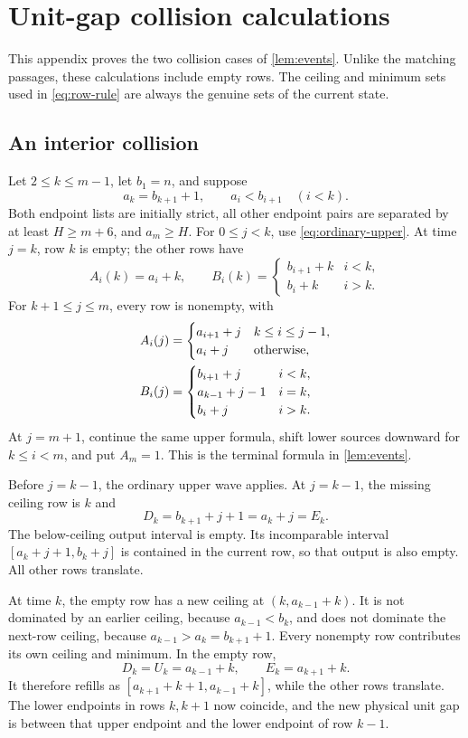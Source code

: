 \section{Unit-gap collision calculations}\label{app:unit}
This appendix proves the two collision cases of \cref{lem:events}. Unlike the matching passages, these calculations include empty rows. The ceiling and minimum sets used in \eqref{eq:row-rule} are always the genuine sets of the current state.

\subsection{An interior collision}
Let $2\le k\le m-1$, let $b_1=n$, and suppose
\[
 a_k=b_{k+1}+1,\qquad a_i<b_{i+1}\quad(i<k).
\]
Both endpoint lists are initially strict, all other endpoint pairs are separated by at least $H\ge m+6$, and $a_m\ge H$. For $0\le j<k$, use \eqref{eq:ordinary-upper}. At time $j=k$, row $k$ is empty; the other rows have
\[
 A_i(k)=a_i+k,\qquad
 B_i(k)=\begin{cases}b_{i+1}+k&i<k,\\b_i+k&i>k.\end{cases}
\]
For $k+1\le j\le m$, every row is nonempty, with
\begin{align}
 A_i(j)&=\begin{cases}a_{i+1}+j&k\le i\le j-1,\\a_i+j&\text{otherwise},\end{cases}\label{eq:interior-phases}\\
 B_i(j)&=\begin{cases}b_{i+1}+j&i<k,\\a_{k-1}+j-1&i=k,\\b_i+j&i>k.\end{cases}\notag
\end{align}
At $j=m+1$, continue the same upper formula, shift lower sources downward for $k\le i<m$, and put $A_m=1$. This is the terminal formula in \cref{lem:events}.

Before $j=k-1$, the ordinary upper wave applies. At $j=k-1$, the missing ceiling row is $k$ and
\[
 D_k=b_{k+1}+j+1=a_k+j=E_k.
\]
The below-ceiling output interval is empty. Its incomparable interval $[a_k+j+1,b_k+j]$ is contained in the current row, so that output is also empty. All other rows translate.

At time $k$, the empty row has a new ceiling at $(k,a_{k-1}+k)$. It is not dominated by an earlier ceiling, because $a_{k-1}<b_k$, and does not dominate the next-row ceiling, because $a_{k-1}>a_k=b_{k+1}+1$. Every nonempty row contributes its own ceiling and minimum. In the empty row,
\[
 D_k=U_k=a_{k-1}+k,\qquad E_k=a_{k+1}+k.
\]
It therefore refills as $[a_{k+1}+k+1,a_{k-1}+k]$, while the other rows translate. The lower endpoints in rows $k,k+1$ now coincide, and the new physical unit gap is between that upper endpoint and the lower endpoint of row $k-1$.

